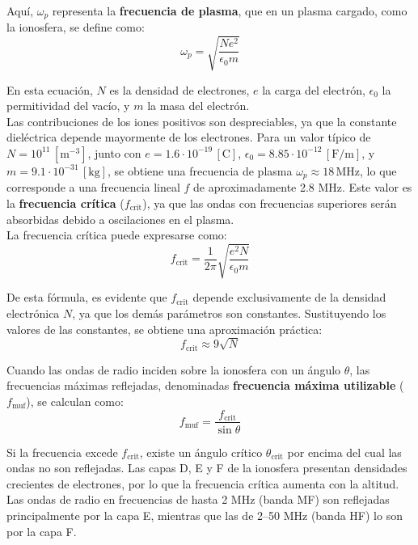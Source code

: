 Aquí, \( \omega_p \) representa la \textbf{frecuencia de plasma}, que en un plasma cargado, como la ionosfera, se define como:
\begin{equation}
\omega_{p} = \sqrt{\frac{N {e}^{2}}{\epsilon_{0} m}}
\end{equation}

En esta ecuación, \( N \) es la densidad de electrones, \( e \) la carga del electrón, \( \epsilon_{0} \) la permitividad del vacío, y \( m \) la masa del electrón.\\

Las contribuciones de los iones positivos son despreciables, ya que la constante dieléctrica depende mayormente de los electrones. Para un valor típico de \( N = {10}^{11} \, [\text{m}^{-3}] \), junto con \( e = 1.6 \cdot 10^{-19} \,[ \text{C}] \), \( \epsilon_{0} = 8.85 \cdot 10^{-12} \, [\text{F/m}] \), y \( m = 9.1 \cdot 10^{-31} \, [\text{kg}] \), se obtiene una frecuencia de plasma \( \omega_{p} \approx 18 \, \text{MHz} \), lo que corresponde a una frecuencia lineal \( f \) de aproximadamente 2.8 MHz. Este valor es la \textbf{frecuencia crítica} (\( f_{\text{crit}} \)), ya que las ondas con frecuencias superiores serán absorbidas debido a oscilaciones en el plasma.\\

La frecuencia crítica puede expresarse como:
\begin{equation}
f_\text{crit} = \frac{1}{2\pi} \sqrt{\frac{e^2 N}{\epsilon_0 m}}
\end{equation}

De esta fórmula, es evidente que \( f_{\text{crit}} \) depende exclusivamente de la densidad electrónica \( N \), ya que los demás parámetros son constantes. Sustituyendo los valores de las constantes, se obtiene una aproximación práctica:
\begin{equation}
f_\text{crit} \approx 9 \sqrt{N}
\end{equation}

Cuando las ondas de radio inciden sobre la ionosfera con un ángulo \( \theta \), las frecuencias máximas reflejadas, denominadas \textbf{frecuencia máxima utilizable} (\( f_{\text{muf}} \)), se calculan como:
\begin{equation}
f_\text{muf} = \frac{f_\text{crit}}{\sin\theta}
\end{equation}

Si la frecuencia excede \( f_{\text{crit}} \), existe un ángulo crítico \( \theta{_\text{crit}} \) por encima del cual las ondas no son reflejadas. Las capas D, E y F de la ionosfera presentan densidades crecientes de electrones, por lo que la frecuencia crítica aumenta con la altitud. Las ondas de radio en frecuencias de hasta 2 MHz (banda MF) son reflejadas principalmente por la capa E, mientras que las de 2–50 MHz (banda HF) lo son por la capa F.\\


